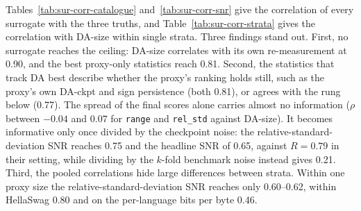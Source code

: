 Tables~\ref{tab:sur-corr-catalogue} and~\ref{tab:sur-corr-snr} give the correlation of every surrogate with the three truths, and Table~\ref{tab:sur-corr-strata} gives the correlation with DA-size within single strata. Three findings stand out.
First, no surrogate reaches the ceiling: DA-size correlates with its own re-measurement at 0.90, and the best proxy-only statistics reach 0.81.
Second, the statistics that track DA best describe whether the proxy's ranking holds still, such as the proxy's own DA-ckpt and sign persistence (both 0.81), or agrees with the rung below (0.77). The spread of the final scores alone carries almost no information ($\rho$ between $-0.04$ and $0.07$ for \texttt{range} and \texttt{rel\_std} against DA-size). It becomes informative only once divided by the checkpoint noise: the relative-standard-deviation SNR reaches 0.75 and the headline SNR of \citet{heineman_signal_2025} 0.65, against $R = 0.79$ in their setting, while dividing by the $k$-fold benchmark noise instead gives 0.21.
Third, the pooled correlations hide large differences between strata. Within one proxy size the relative-standard-deviation SNR reaches only 0.60--0.62, within HellaSwag 0.80 and on the per-language bits per byte 0.46.

